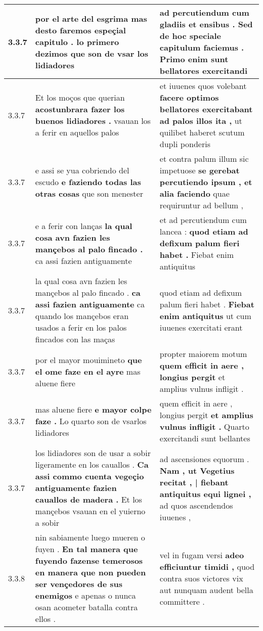 \begin{tabular}{|p{1cm}|p{6.5cm}|p{6.5cm}|}
3.3.7 & por el arte del esgrima \textbf{ mas desto faremos espeçial capitulo . } lo primero dezimos que son de vsar los lidiadores & ad percutiendum cum gladiis et ensibus . \textbf{ Sed de hoc speciale capitulum faciemus . } Primo enim sunt bellatores exercitandi \\\hline
3.3.7 & Et los moços que querian \textbf{ acostunbrara fazer los buenos lidiadores . } vsauan los a ferir en aquellos palos & et iuuenes quos volebant \textbf{ facere optimos bellatores exercitabant ad palos illos ita , } ut quilibet haberet scutum dupli ponderis \\\hline
3.3.7 & e assi se yua cobriendo del escudo \textbf{ e faziendo todas las otras cosas } que son menester & et contra palum illum sic impetuose \textbf{ se gerebat percutiendo ipsum , et alia faciendo } quae requiruntur ad bellum , \\\hline
3.3.7 & e a ferir con lanças \textbf{ la qual cosa avn fazien les mançebos al palo fincado . } ca assi fazien antiguamente & et ad percutiendum cum lancea : \textbf{ quod etiam ad defixum palum fieri habet . } Fiebat enim antiquitus \\\hline
3.3.7 & la qual cosa avn fazien les mançebos al palo fincado . \textbf{ ca assi fazien antiguamente } ca quando los mançebos eran usados a ferir en los palos fincados con las maças & quod etiam ad defixum palum fieri habet . \textbf{ Fiebat enim antiquitus } ut cum iuuenes exercitati erant \\\hline
3.3.7 & por el mayor mouimineto \textbf{ que el ome faze en el ayre } mas aluene fiere & propter maiorem motum \textbf{ quem efficit in aere , longius pergit } et amplius vulnus infligit . \\\hline
3.3.7 & mas aluene fiere \textbf{ e mayor colpe faze . } Lo quarto son de vsarlos lidiadores & quem efficit in aere , longius pergit \textbf{ et amplius vulnus infligit . } Quarto exercitandi sunt bellantes \\\hline
3.3.7 & los lidiadores son de usar a sobir ligeramente en los cauallos . \textbf{ Ca assi commo cuenta vegeçio antiguamente fazien cauallos de madera . } Et los mançebos vsauan en el yuierno a sobir & ad ascensiones equorum . \textbf{ Nam , ut Vegetius recitat , | fiebant antiquitus equi lignei , } ad quos ascendendos iuuenes , \\\hline
3.3.8 & nin sabiamente luego mueren o fuyen . \textbf{ En tal manera que fuyendo fazense temerosos en manera que non pueden ser vençedores de sus enemigos } e apenas o nunca osan acometer batalla contra ellos . & vel in fugam versi \textbf{ adeo efficiuntur timidi , } quod contra suos victores vix aut nunquam audent bella committere . \\\hline

\end{tabular}
